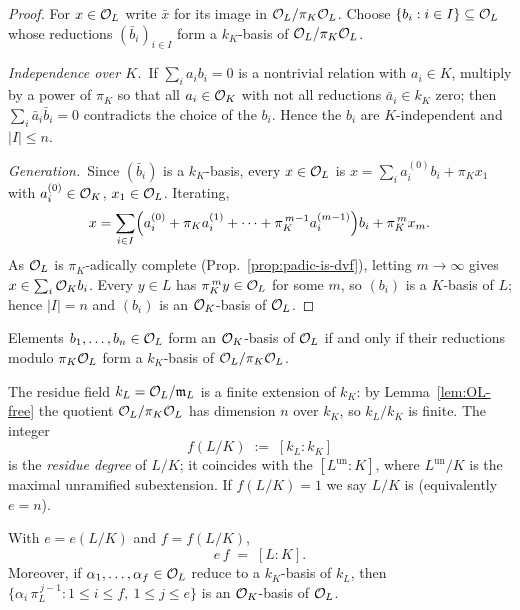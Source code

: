 \begin{proof}
For $x\in\mathcal{O}_L$ write $\bar x$ for its image in $\mathcal{O}_L/\pi_K\mathcal{O}_L$. Choose
$\{b_i:i\in I\}\subseteq\mathcal{O}_L$ whose reductions $(\bar b_i)_{i\in I}$ form a
$k_K$-basis of $\mathcal{O}_L/\pi_K\mathcal{O}_L$.

\emph{Independence over $K$.}\ If $\sum_i a_ib_i=0$ is a nontrivial relation with
$a_i\in K$, multiply by a power of $\pi_K$ so that all $a_i\in\mathcal{O}_K$ with not all
reductions $\bar a_i\in k_K$ zero; then $\sum_i\bar a_i\bar b_i=0$ contradicts
the choice of the $b_i$. Hence the $b_i$ are $K$-independent and $|I|\le n$.

\emph{Generation.}\ Since $(\bar b_i)$ is a $k_K$-basis, every $x\in\mathcal{O}_L$ is
$x=\sum_i a_i^{(0)}b_i+\pi_Kx_1$ with $a_i^{(0)}\in\mathcal{O}_K$, $x_1\in\mathcal{O}_L$. Iterating,
\[
  x=\sum_{i\in I}\Bigl(a_i^{(0)}+\pi_Ka_i^{(1)}+\cdots+\pi_K^{\,m-1}a_i^{(m-1)}\Bigr)b_i
    +\pi_K^{\,m}x_m .
\]
As $\mathcal{O}_L$ is $\pi_K$-adically complete (Prop.~\ref{prop:padic-is-dvf}), letting
$m\to\infty$ gives $x\in\sum_i\mathcal{O}_K b_i$. Every $y\in L$ has $\pi_K^{\,m}y\in\mathcal{O}_L$
for some $m$, so $(b_i)$ is a $K$-basis of $L$; hence $|I|=n$ and $(b_i)$ is an
$\mathcal{O}_K$-basis of $\mathcal{O}_L$.
\end{proof}

\begin{remark}
\label{rem:basis-criterion}
Elements $b_1,\dots,b_n\in\mathcal{O}_L$ form an $\mathcal{O}_K$-basis of $\mathcal{O}_L$ if and only if their
reductions modulo $\pi_K\mathcal{O}_L$ form a $k_K$-basis of $\mathcal{O}_L/\pi_K\mathcal{O}_L$.
\end{remark}

\begin{definition}
\label{def:residue-degree}
\mathlibok
The residue field $k_L=\mathcal{O}_L/\mathfrak{m}_L$ is a finite extension of $k_K$: by
Lemma~\ref{lem:OL-free} the quotient $\mathcal{O}_L/\pi_K\mathcal{O}_L$ has dimension $n$ over
$k_K$, so $k_L/k_K$ is finite. The integer
\[
  f(L/K) \;:=\; [k_L:k_K]
\]
is the \emph{residue degree} of $L/K$; it coincides with the
 $[L^{\mathrm{un}}:K]$, where
$L^{\mathrm{un}}/K$ is the maximal unramified subextension. If $f(L/K)=1$ we say
$L/K$ is  (equivalently $e=n$).
\end{definition}

\begin{proposition}
\label{prop:ef-eq-degree}
\leanok
\notready
With $e=e(L/K)$ and $f=f(L/K)$,
\[
  e\,f \;=\; [L:K].
\]
Moreover, if $\alpha_1,\dots,\alpha_f\in\mathcal{O}_L$ reduce to a $k_K$-basis of $k_L$,
then $\{\alpha_i\,\pi_L^{\,j-1}:1\le i\le f,\ 1\le j\le e\}$ is an $\mathcal{O}_K$-basis of
$\mathcal{O}_L$.
\end{proposition}

